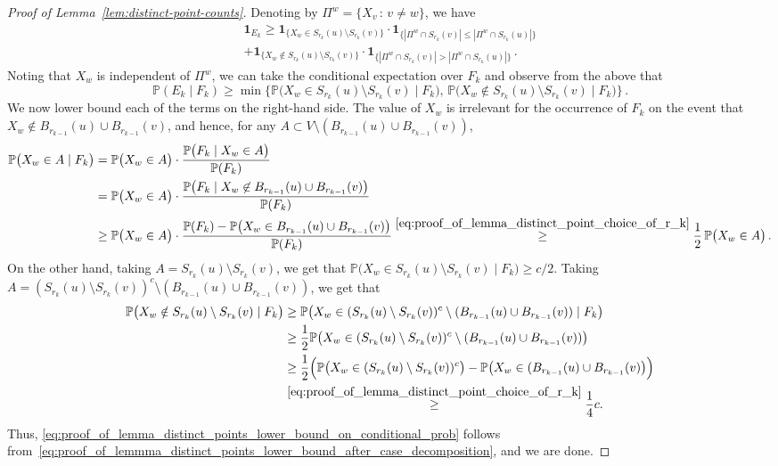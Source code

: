 \documentclass[10pt,a4paper]{amsart}
\def\P{\mathbb{P}}
\begin{document}
\begin{proof}[Proof of Lemma~\ref{lem:distinct-point-counts}]
    Denoting by $\Pi^w =\{ X_v \, : \, v\not=w \}$, we have
    \begin{multline*}
    \mathbf{1}_{E_k} \ge \mathbf{1}_{\{X_w \in S_{r_k}(u) \setminus S_{r_k}(v)\}} \cdot \mathbf{1}_{\{|\Pi^w \cap S_{r_k}(v)| \le |\Pi^w \cap S_{r_k}(u)| \}} \\ +  \mathbf{1}_{\{X_w \notin S_{r_k}(u) \setminus S_{r_k}(v)\}} \cdot \mathbf{1}_{\{|\Pi^w \cap S_{r_k}(v)| > |\Pi^w \cap S_{r_k}(u)|\}} \, .
    \end{multline*}
    Noting that $X_w$ is independent of $\Pi^w$, we can take the conditional expectation over $F_k$ and observe from the above that
    \begin{equation} \label{eq:proof_of_lemmma_distinct_points_lower_bound_after_case_decomposition}
    \P(E_k \mid F_k )\ge \min\Big\{ \P\big(X_w \in S_{r_k}(u) \setminus S_{r_k}(v) \mid F_k \big) , \, \P\big(X_w \not \in S_{r_k}(u) \setminus S_{r_k}(v) \mid F_k \big)  \Big\} \, .    
    \end{equation}
    We now lower bound each of the terms on the right-hand side.
    The value of $X_w$ is irrelevant for the occurrence of $F_k$ on the event that $X_w \notin B_{r_{k-1}}(u) \cup B_{r_{k-1}}(v)$, and hence, for any $A \subset V \setminus (B_{r_{k-1}}(u) \cup B_{r_{k-1}}(v))$,
    \begin{align*}
        \P\big(X_w \in A \mid F_k \big) &= \P\big(X_w \in A \big) \cdot \frac{\P\big(F_k \mid X_w \in A \big)}{\P(F_k)} \\
        &= \P\big(X_w \in A \big) \cdot \frac{\P\big(F_k \mid X_w \not \in B_{r_{k-1}}(u) \cup B_{r_{k-1}}(v) \big)}{\P(F_k)} \\
        & \ge  \P\big(X_w \in A \big) \cdot \frac{\P(F_k) - \P\big( X_w \in B_{r_{k-1}}(u) \cup B_{r_{k-1}}(v) \big)}{\P(F_k)} \stackrel{\eqref{eq:proof_of_lemma_distinct_point_choice_of_r_k}}\ge \frac12 \, \P\big(X_w \in A \big) \, .
    \end{align*}
    On the other hand, taking $A=S_{r_k}(u) \setminus S_{r_k}(v)$, we get that $\P\big(X_w \in S_{r_k}(u) \setminus S_{r_k}(v) \mid F_k \big) \ge c/2$.
    Taking $A=(S_{r_k}(u) \setminus S_{r_k}(v))^c \setminus (B_{r_{k-1}}(u) \cup B_{r_{k-1}}(v))$, we get that
    \begin{align*}
       \P\big(X_w \notin S_{r_k}(u) \setminus S_{r_k}(v) \mid F_k \big) &\ge \P\big(X_w \in  (S_{r_k}(u) \setminus S_{r_k}(v))^c \setminus (B_{r_{k-1}}(u) \cup B_{r_{k-1}}(v))  \mid F_k \big) \\ & \ge \frac{1}{2} \P\big(X_w \in  (S_{r_k}(u) \setminus S_{r_k}(v))^c \setminus (B_{r_{k-1}}(u) \cup B_{r_{k-1}}(v))  \big) \\ &\ge \frac{1}{2} \Big(\P\big(X_w \in  (S_{r_k}(u) \setminus S_{r_k}(v))^c   \big) -  \P \big(X_w\in (B_{r_{k-1}}(u) \cup B_{r_{k-1}}(v) \big) \Big) \\  &\stackrel{\eqref{eq:proof_of_lemma_distinct_point_choice_of_r_k}}\ge \frac14 c . 
    \end{align*}
    Thus, \eqref{eq:proof_of_lemma_distinct_points_lower_bound_on_conditional_prob} follows from~\eqref{eq:proof_of_lemmma_distinct_points_lower_bound_after_case_decomposition}, and we are done. 
\end{proof}
\end{document}
